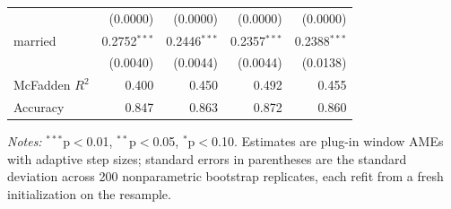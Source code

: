 \begin{table}[htbp]
\begin{threeparttable}
\begin{tabular}{lrrrr}
 & (0.0000) & (0.0000) & (0.0000) & (0.0000) \\
married & 0.2752$^{***}$ & 0.2446$^{***}$ & 0.2357$^{***}$ & 0.2388$^{***}$ \\
 & (0.0040) & (0.0044) & (0.0044) & (0.0138) \\
\midrule
McFadden $R^2$ & 0.400 & 0.450 & 0.492 & 0.455 \\
Accuracy & 0.847 & 0.863 & 0.872 & 0.860 \\
\bottomrule
\end{tabular}
\begin{tablenotes}
\footnotesize
\item \textit{Notes:} $^{***}$p$<$0.01, $^{**}$p$<$0.05, $^{*}$p$<$0.10. Estimates are plug-in window AMEs with adaptive step sizes; standard errors in parentheses are the standard deviation across 200 nonparametric bootstrap replicates, each refit from a fresh initialization on the resample.
\end{tablenotes}
\end{threeparttable}
\end{table}